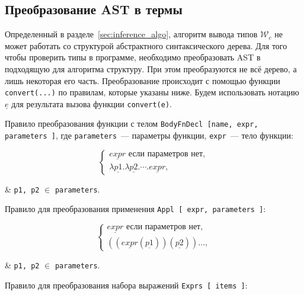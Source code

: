 \subsection{Преобразование AST в термы}
\label{subsec:ast_transformation}

Определенный в разделе~\ref{sec:inference_algo}, алгоритм вывода типов $\mathcal{W}_c$ не может работать со структурой абстрактного синтаксического дерева.
Для того чтобы проверить типы в программе, необходимо преобразовать AST в подходящую для алгоритма структуру.
При этом преобразуются не всё дерево, а лишь некоторая его часть.
Преобразование происходит с помощью функции \lstinline{convert(...)} по правилам, которые указаны ниже.
Будем использовать нотацию $\underline{e}$ для результата вызова функции \lstinline{convert(e)}.

Правило преобразования функции с телом \lstinline{BodyFnDecl [name, expr, parameters ]}, где \lstinline{parameters}~--- параметры функции, \lstinline{expr}~--- тело функции:

\begin{equation}
    \label{eq:conv_bfn}
    \begin{cases}
        \underline{expr} \text{ если параметров нет}, \\
        \lambda \underline{p1}. \lambda \underline{p2}. \cdots. \underline{expr},
    \end{cases}
\end{equation}
\begin{eqrem}
    & \texttt{p1, p2} $\in$ \texttt{parameters}.
\end{eqrem}

Правило для преобразования применения \lstinline{Appl [ expr, parameters ]}:

\begin{equation}
    \label{eq:conv_appl}
    \begin{cases}
        \underline{expr} \text{ если параметров нет}, \\
        ((\underline{expr}(\underline{p1}))(\underline{p2}))\ldots,
    \end{cases}
\end{equation}
\begin{eqrem}
    & \texttt{p1, p2} $\in$ \texttt{parameters}.
\end{eqrem}

Правило для преобразования набора выражений \lstinline{Exprs [ items ]}:

